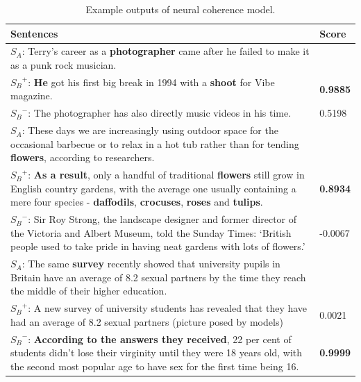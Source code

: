 \documentclass[letterpaper]{article} %
\begin{document}
      \begin{table}[htb]
		\centering
		\caption{Example outputs of neural coherence model.}
		\label{tab:coherence_examples}
		\begin{tabular}{|p{65mm}|p{11mm}|}
			\hline
			 \centering Sentences &  Score \\\hline
			$S_A$: \small{Terry's career as a \textbf{photographer} came after he failed to make it as a punk rock musician.} & \\
			${S_B}^{+}$: \small{\textbf{He} got his first big break in 1994 with a \textbf{shoot} for Vibe magazine.} & \textbf{0.9885} \\
			${S_B}^{-}$: \small{The photographer has also directly music videos in his time.} & 0.5198 \\
			 \hline
			 $S_A$: \small{These days we are increasingly using outdoor space for the occasional barbecue or to relax in a hot tub rather than for tending \textbf{flowers}, according to researchers.} & \\
			 ${S_B}^{+}$: \small{\textbf{As a result}, only a handful of traditional \textbf{flowers} still grow in English country gardens, with the average one usually containing a mere four species - \textbf{daffodils}, \textbf{crocuses}, \textbf{roses} and \textbf{tulips}.} & \textbf{0.8934} \\
			 ${S_B}^{-}$: \small{Sir Roy Strong, the landscape designer and former director of the Victoria and Albert Museum, told the Sunday Times: `British people used to take pride in having neat gardens with lots of flowers.'} & -0.0067 \\
			\hline
			$S_A$: \small{The same \textbf{survey} recently showed that university pupils in Britain have an average of 8.2 sexual partners by the time they reach the middle of their higher education.} & \\
			${S_B}^{+}$: \small{A new survey of university students has revealed that they have had an average of 8.2 sexual partners (picture posed by models)} & 0.0021 \\
			${S_B}^{-}$: \small{\textbf{According to the answers they received}, 22 per cent of students didn't lose their virginity until they were 18 years old, with the second most popular age to have sex for the first time being 16. } & \textbf{0.9999} \\
			\hline
		\end{tabular}
	\end{table}
	
\end{document}
